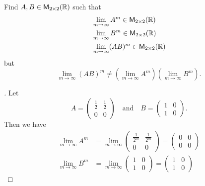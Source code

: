 \begin{ex}\label{ex:5.3.5}
	Find \(A, B \in \ms[2][2][\R]\) such that
	\begin{align*}
		 & \lim_{m \to \infty} A^m \in \ms[2][2][\R]    \\
		 & \lim_{m \to \infty} B^m \in \ms[2][2][\R]    \\
		 & \lim_{m \to \infty} (AB)^m \in \ms[2][2][\R]
	\end{align*}
	but
	\[
		\lim_{m \to \infty} (AB)^m \neq (\lim_{m \to \infty} A^m) (\lim_{m \to \infty} B^m).
	\]
\end{ex}

\begin{proof}[]
	Let
	\[
		A = \begin{pmatrix}
			\frac{1}{2} & \frac{1}{2} \\
			0           & 0
		\end{pmatrix} \quad \text{and} \quad B = \begin{pmatrix}
			1 & 0 \\
			1 & 0
		\end{pmatrix}.
	\]
	Then we have
	\begin{align*}
		\lim_{m \to \infty} A^m    & = \lim_{m \to \infty} \begin{pmatrix}
			                                                   \frac{1}{2^m} & \frac{1}{2^m} \\
			                                                   0             & 0
		                                                   \end{pmatrix} = \begin{pmatrix}
			                                                                   0 & 0 \\
			                                                                   0 & 0
		                                                                   \end{pmatrix} \\
		\lim_{m \to \infty} B^m    & = \lim_{m \to \infty} \begin{pmatrix}
			                                                   1 & 0 \\
			                                                   1 & 0
		                                                   \end{pmatrix} = \begin{pmatrix}
			                                                                   1 & 0 \\
			                                                                   1 & 0

\end{pmatrix}
\end{align*}
\end{proof}
